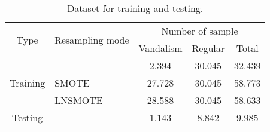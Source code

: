 \begin{table}[hb!]
\caption{Dataset for training and testing.}
\centering
\begin{tabular}{|| c | l | c | c | c ||}
\hline
\multirow{2}{*}{Type} & \multirow{2}{*}{Resampling mode}
	& \multicolumn{3}{c||}{Number of sample} \\
\cline{3-5}
    & & Vandalism & Regular & Total \\
\hline
\hline
\multirow{3}{*}{Training} & -       &  2.394 & 30.045 & 32.439 \\
                              & SMOTE   & 27.728 & 30.045 & 58.773 \\
                              & LNSMOTE & 28.588 & 30.045 & 58.633 \\
\hline
Testing & - & 1.143 & 8.842 & 9.985 \\
\hline
\end{tabular}
\label{table:dataset}
\end{table}
